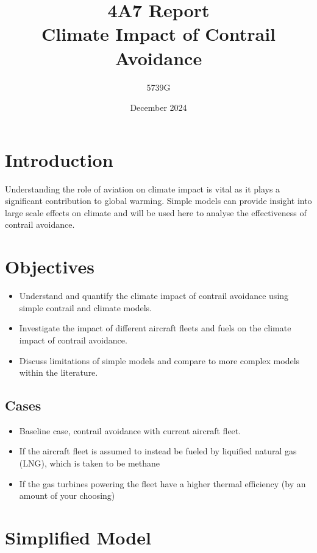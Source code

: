 \documentclass{article}
\begin{document}
\title{4A7 Report \\ Climate Impact of Contrail Avoidance}
\author{5739G}
\date{December 2024}
\maketitle

\section{Introduction}
Understanding the role of aviation on climate impact is vital as it plays a significant contribution to global warming.
Simple models can provide insight into large scale effects on climate and will be used here to analyse the effectiveness of contrail avoidance. 

\section{Objectives}

\begin{itemize}
    \item Understand and quantify the climate impact of contrail avoidance using simple contrail and climate models.
    \item Investigate the impact of different aircraft fleets and fuels on the climate impact of contrail avoidance.
    \item Discuss limitations of simple models and compare to more complex models within the literature.
\end{itemize}

\subsection{Cases}

\begin{itemize}
    \item Baseline case, contrail avoidance with current aircraft fleet.
    \item If the aircraft fleet is assumed to instead be fueled by liquified natural gas (LNG), which is taken to be methane
    \item If the gas turbines powering the fleet have a higher thermal efficiency (by an amount of your choosing) 
\end{itemize}

\section{Simplified Model}
\end{document}
